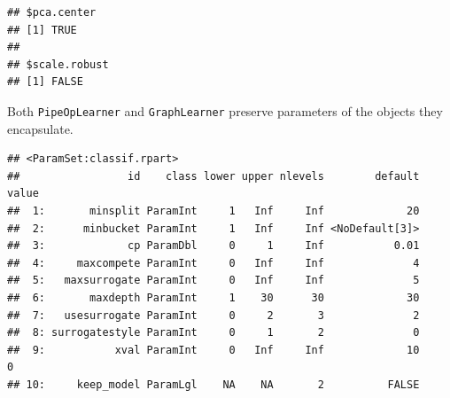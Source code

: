 \documentclass[
]{scrbook}
\newenvironment{Shaded}{\begin{snugshade}}{\end{snugshade}}
\newcommand{\FunctionTok}[1]{\textcolor[rgb]{0.00,0.00,0.00}{#1}}
\newcommand{\NormalTok}[1]{#1}
\newcommand{\OtherTok}[1]{\textcolor[rgb]{0.56,0.35,0.01}{#1}}
\newcommand{\SpecialCharTok}[1]{\textcolor[rgb]{0.00,0.00,0.00}{#1}}
\newcommand{\StringTok}[1]{\textcolor[rgb]{0.31,0.60,0.02}{#1}}
\renewenvironment{Shaded} {\begin{snugshade}\small} {\end{snugshade}}
\begin{document}
\begin{Shaded}
\end{Shaded}

\begin{verbatim}
## $pca.center
## [1] TRUE
## 
## $scale.robust
## [1] FALSE
\end{verbatim}

Both \texttt{PipeOpLearner} and \texttt{GraphLearner} preserve parameters of the objects they encapsulate.

\begin{Shaded}
\end{Shaded}

\begin{verbatim}
## <ParamSet:classif.rpart>
##                 id    class lower upper nlevels        default value
##  1:       minsplit ParamInt     1   Inf     Inf             20      
##  2:      minbucket ParamInt     1   Inf     Inf <NoDefault[3]>      
##  3:             cp ParamDbl     0     1     Inf           0.01      
##  4:     maxcompete ParamInt     0   Inf     Inf              4      
##  5:   maxsurrogate ParamInt     0   Inf     Inf              5      
##  6:       maxdepth ParamInt     1    30      30             30      
##  7:   usesurrogate ParamInt     0     2       3              2      
##  8: surrogatestyle ParamInt     0     1       2              0      
##  9:           xval ParamInt     0   Inf     Inf             10     0
## 10:     keep_model ParamLgl    NA    NA       2          FALSE
\end{verbatim}

\begin{Shaded}
\end{Shaded}
\end{document}

